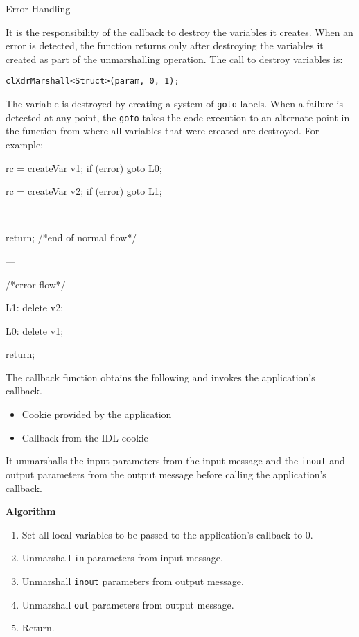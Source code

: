 \begin{flushleft}
\begin{Desc}
\item
[Error Handling]
\end{Desc}
It is the responsibility of the callback to destroy the variables it creates. When an error is detected, the function returns only after destroying the 
variables it created as part of the unmarshalling operation. The call to destroy variables is:
\par
{\tt{clXdrMarshall<Struct>(param, 0, 1);}}
\par
The variable is destroyed by creating a system of {\tt{goto}} labels. When a failure is detected at any point, the {\tt{goto}} takes the code execution to an 
alternate point in the function from where all variables that were created are destroyed.
For example:
\par
{\tt{rc = createVar v1;
if (error) goto L0;\par
rc = createVar v2;
if (error) goto L1;\par
---\par
return;
/*end of normal flow*/\par
---\par
/*error flow*/\par
L1: delete v2;\par
L0: delete v1;\par
return;}}
\par
The callback function obtains the following and invokes the application's callback.
\begin{itemize}
\item
Cookie provided by the application
\item
Callback from the IDL cookie 
\end{itemize}
It unmarshalls the input parameters from the input message and the {\tt{inout}} and output parameters from the output message before calling the 
application's callback.

\textbf{Algorithm}\par
\begin{enumerate}
\item
Set all local variables to be passed to the application's callback to 0.
\item
Unmarshall {\tt{in}} parameters from input message.
\item
Unmarshall {\tt{inout}} parameters from output message.
\item
Unmarshall {\tt{out}} parameters from output message.
\item
Return.
\end{enumerate}


\end{flushleft}
